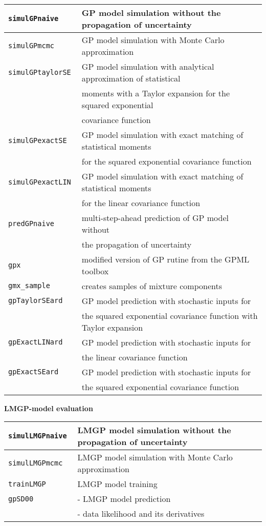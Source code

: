 \documentclass[12pt,twoside]{article}
\newcommand{\fun}[1]{\tt #1}
\begin{document}
{ \\
\begin{tabular}{|l|l|}
 \hline \fun{simulGPnaive} & GP model simulation without the propagation of uncertainty \\
 \hline \fun{simulGPmcmc} & GP model simulation with Monte Carlo approximation\\
 \hline \fun{simulGPtaylorSE} & GP model simulation with analytical approximation of statistical\\
 & moments with a Taylor expansion for the squared exponential\\
 & covariance function\\
 \hline \fun{simulGPexactSE} & GP model simulation with exact matching of statistical moments\\
 &for the squared exponential covariance function \\
 \hline \fun{simulGPexactLIN} & GP model simulation with exact matching of statistical moments\\
 &for the linear covariance function \\
 \hline \fun{predGPnaive} & multi-step-ahead prediction of GP model without\\
 &the propagation of uncertainty\\
 \hline \fun{gpx} & modified version of GP rutine from the GPML toolbox \\
 \hline \fun{gmx\_sample} & creates samples of mixture components \\
 \hline \fun{gpTaylorSEard} & GP model prediction with stochastic inputs for\\ &the squared exponential covariance function with Taylor expansion\\
 \hline \fun{gpExactLINard} & GP model prediction with stochastic inputs for\\ &the linear covariance function \\
 \hline \fun{gpExactSEard} & GP model prediction with stochastic inputs for\\ &the squared exponential covariance function \\
 \hline
%
\end{tabular}

\pagebreak
{\bf  LMGP-model evaluation} \\
\begin{tabular}{|l|l|}
  \hline \fun{simulLMGPnaive} & LMGP model simulation without the propagation of uncertainty \\
 \hline \fun{simulLMGPmcmc} & LMGP model simulation with Monte Carlo approximation\\
  \hline \fun{trainLMGP} & LMGP model training \\
  \hline \fun{gpSD00} & - LMGP model prediction \\
  & - data likelihood and its derivatives \\
\hline
\end{tabular}

}
\end{document}
